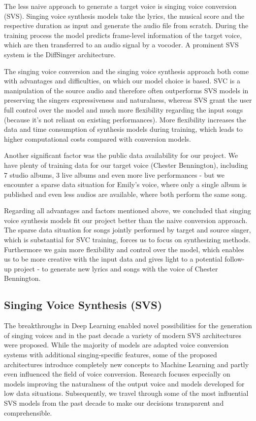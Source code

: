 \documentclass[a4paper]{article}
\begin{document}
	The less naive approach to generate a target voice is singing voice conversion (SVS). Singing voice synthesis models take the lyrics, the musical score and the respective duration as input and generate the audio file from scratch. During the training process the model predicts frame-level information of the target voice, which are then transferred to an audio signal by a vocoder. \cite{Cho2021} A prominent SVS system is the DiffSinger architecture.
	
	The singing voice conversion and the singing voice synthesis approach both come with advantages and difficulties, on which our model choice is based. SVC is a manipulation of the source audio and therefore often outperforms SVS models in preserving the singers expressiveness and naturalness, whereas SVS grant the user full control over the model and much more flexibility regarding the input songs (because it’s not reliant on existing performances). More flexibility increases the data and time consumption of synthesis models during training, which leads to higher computational costs compared with conversion models. 
	
	Another significant factor was the public data availability for our project. We have plenty of training data for our target voice (Chester Bennington), including 7 studio albums, 3 live albums and even more live performances - but we encounter a sparse data situation for Emily’s voice, where only a single album is published and even less audios are available, where both perform the same song.
	
	Regarding all advantages and factors mentioned above, we concluded that singing voice synthesis models fit our project better than the naive conversion approach. The sparse data situation for songs jointly performed by target and source singer, which is substantial for SVC training, forces us to focus on synthesizing methods. Furthermore we gain more flexibility and control over the model, which enables us to be more creative with the input data and gives light to a potential follow-up project - to generate new lyrics and songs with the voice of Chester Bennington.
	
	\subsection{Singing Voice Synthesis (SVS)}
	
	The breakthroughs in Deep Learning enabled novel possibilities for the generation of singing voices and in the past decade a variety of modern SVS architectures were proposed. While the majority of models are adapted voice conversion systems with additional singing-specific features, some of the proposed architectures introduce completely new concepts to Machine Learning and partly even influenced the field of voice conversion. Research focuses especially on models improving the naturalness of the output voice and models developed for low data situations. Subsequently, we travel through some of the most influential SVS models from the past decade to make our decisions transparent and comprehensible. \cite{Cho2021}
	
\end{document}
